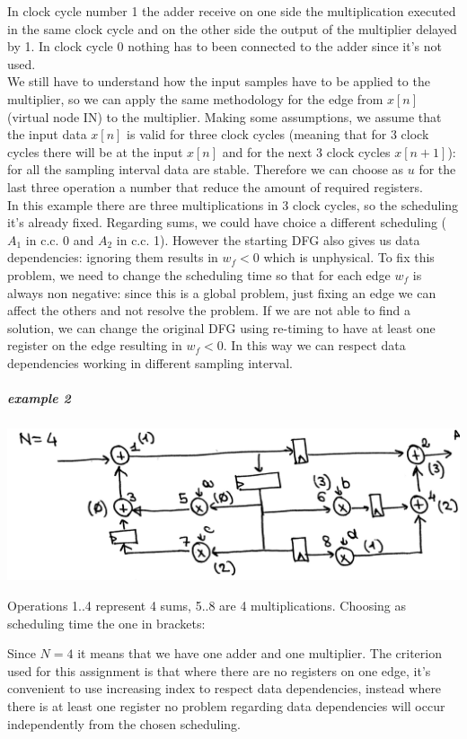 In clock cycle number 1 the adder receive on one side the multiplication executed in the same clock cycle and on the other side the output of the multiplier delayed by 1. In clock cycle 0  nothing has to been connected to the adder since it's not used.\\

We still have to understand how the input samples have to be applied to the multiplier, so we can apply the same methodology for the edge from $x[n]$ (virtual node IN) to the multiplier. Making some assumptions, we assume that the input data $x[n]$ is valid for three clock cycles (meaning that for 3 clock cycles there will be at the input $x[n]$ and for the next 3 clock cycles $x[n+1]$): for all the sampling interval data are stable. Therefore we can choose as $u$ for the last three operation a number that reduce the amount of required registers.\\

In this example there are three multiplications in 3 clock cycles, so the scheduling it's already fixed. Regarding sums, we could have choice a different scheduling ($A_1$ in c.c. 0 and $A_2$ in c.c. 1). However the starting DFG also gives us data dependencies: ignoring them results in $w_f < 0$ which is unphysical. To fix this problem, we need to change the scheduling time so that for each edge $w_f$ is always non negative: since this is a global problem, just fixing an edge we can affect the others and not resolve the problem. If we are not able to find a solution, we can change the original DFG using re-timing to have at least one register on the edge resulting in $w_f<0$. In this way we can respect data dependencies working in different sampling interval.

\subparagraph{example 2}

\begin{center}
  \includegraphics[width=0.7\linewidth]{img/img1/35}
\end{center}

Operations 1..4 represent 4 sums, 5..8 are 4 multiplications. Choosing as scheduling time the one in brackets:

Since $N=4$ it means that we have one adder and one multiplier. The criterion used for this assignment is that where there are no registers on one edge, it's convenient to use increasing index to respect data dependencies, instead where there is at least one register no problem regarding data dependencies will occur independently from the chosen scheduling.

